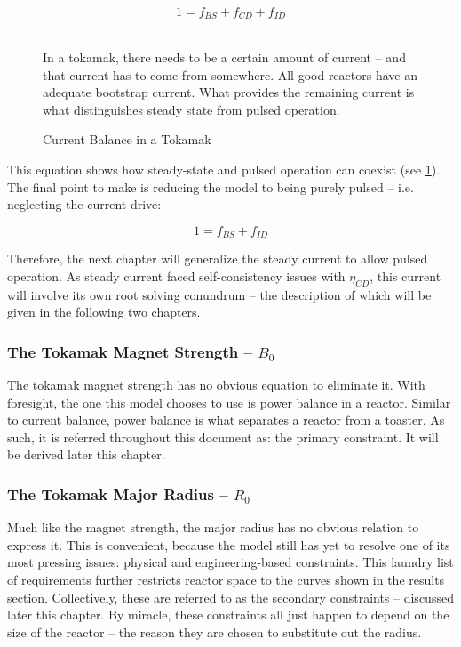 \begin{equation}
	1 = f_{BS} + f_{CD} + f_{ID}
\end{equation}

\begin{figure}
	\centering
	\begin{adjustbox}{width=0.75\textwidth}
		
	\end{adjustbox}
	\caption{Current Balance in a Tokamak} ~\\
	\small In a tokamak, there needs to be a certain amount of current -- and that current has to come from somewhere. All good reactors have an adequate bootstrap current. What provides the remaining current is what distinguishes steady state from pulsed operation.
	\label{fig:curbal}
\end{figure}

This equation shows how steady-state and pulsed operation can coexist (see \cref{fig:curbal}). The final point to make is reducing the model to being purely pulsed -- i.e. neglecting the current drive:

\begin{equation}
	1 = f_{BS} + f_{ID}
\end{equation}

Therefore, the next chapter will generalize the steady current to allow pulsed operation. As steady current faced self-consistency issues with $\eta_{CD}$, this current will involve its own root solving conundrum -- the description of which will be given in the following two chapters.

\subsubsection{The Tokamak Magnet Strength -- $B_0$}

The tokamak magnet strength has no obvious equation to eliminate it. With foresight, the one this model chooses to use is power balance in a reactor. Similar to current balance, power balance is what separates a reactor from a toaster. As such, it is referred throughout this document as: the primary constraint. It will be derived later this chapter.

\subsubsection{The Tokamak Major Radius -- $R_0$}

Much like the magnet strength, the major radius has no obvious relation to express it. This is convenient, because the model still has yet to resolve one of its most pressing issues: physical and engineering-based constraints. This laundry list of requirements further restricts reactor space to the curves shown in the results section. Collectively, these are referred to as the secondary constraints -- discussed later this chapter. By miracle, these constraints all just happen to depend on the size of the reactor -- the reason they are chosen to substitute out the radius. 

